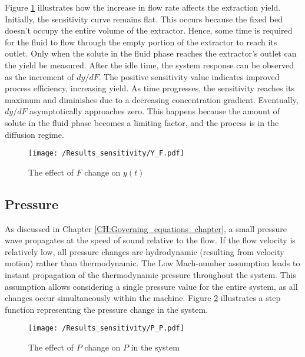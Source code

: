 \documentclass[../Article_Model_Parameters.tex]{subfiles}
\begin{document}
    Figure \ref{fig:Sensitivty_F_y} illustrates how the increase in flow rate affects the extraction yield. Initially, the sensitivity curve remains flat. This occurs because the fixed bed doesn't occupy the entire volume of the extractor. Hence, some time is required for the fluid to flow through the empty portion of the extractor to reach its outlet. Only when the solute in the fluid phase reaches the extractor's outlet can the yield be measured. After the idle time, the system response can be observed as the increment of  $dy/dF$. The positive sensitivity value indicates improved process efficiency, increasing yield. As time progresses, the sensitivity reaches its maximum and diminishes due to a decreasing concentration gradient. Eventually, $dy/dF$ asymptotically approaches zero. This happens because the amount of solute in the fluid phase becomes a limiting factor, and the process is in the diffusion regime. %
    
    \begin{figure}[h!]
    	\centering
    	\texttt{[image: /Results\_sensitivity/Y\_F.pdf]}
    	\caption{The effect of $F$ change on $y(t)$}
    	\label{fig:Sensitivty_F_y}
    \end{figure}
    
    \subsection{Pressure}
    
    As discussed in Chapter \ref{CH:Governing_equations_chapter}, a small pressure wave propagates at the speed of sound relative to the flow. If the flow velocity is relatively low, all pressure changes are hydrodynamic (resulting from velocity motion) rather than thermodynamic. The Low Mach-number assumption leads to instant propagation of the thermodynamic pressure throughout the system. This assumption allows considering a single pressure value for the entire system, as all changes occur simultaneously within the machine. Figure \ref{fig:Sensitivty_P_P} illustrates a step function representing the pressure change in the system.
    
    \begin{figure}[h!]
    	\centering
    	\texttt{[image: /Results\_sensitivity/P\_P.pdf]}
    	\caption{The effect of $P$ change on $P$ in the system}
    	\label{fig:Sensitivty_P_P}
    \end{figure}
    
\end{document}
